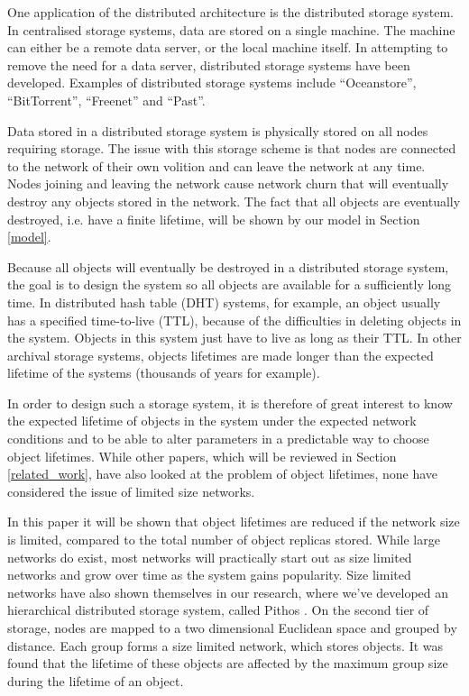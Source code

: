 \documentclass[10pt,a4paper,conference]{IEEEtran}
\begin{document}
One application of the distributed architecture is the distributed storage system. In centralised storage systems, data are stored on a single machine. The machine can either be a remote data server, or the local machine itself. In attempting to remove the need for a data server, distributed storage systems have been developed. Examples of distributed storage systems include ``Oceanstore'', ``BitTorrent'', ``Freenet'' and ``Past''.

Data stored in a distributed storage system is physically stored on all nodes requiring storage. The issue with this storage scheme is that nodes are connected to the network of their own volition and can leave the network at any time. Nodes joining and leaving the network cause network churn that will eventually destroy any objects stored in the network. The fact that all objects are eventually destroyed, i.e. have a finite lifetime, will be shown by our model in Section \ref{model}.

Because all objects will eventually be destroyed in a distributed storage system, the goal is to design the system so all objects are available for a sufficiently long time. In distributed hash table (DHT) systems, for example, an object usually has a specified time-to-live (TTL), because of the difficulties in deleting objects in the system. Objects in this system just have to live as long as their TTL. In other archival storage systems, objects lifetimes are made longer than the expected lifetime of the systems (thousands of years for example).

In order to design such a storage system, it is therefore of great interest to know the expected lifetime of objects in the system under the expected network conditions and to be able to alter parameters in a predictable way to choose object lifetimes. While other papers, which will be reviewed in Section \ref{related_work}, have also looked at the problem of object lifetimes, none have considered the issue of limited size networks.

In this paper it will be shown that object lifetimes are reduced if the network size is limited, compared to the total number of object replicas stored. While large networks do exist, most networks will practically start out as size limited networks and grow over time as the system gains popularity. Size limited networks have also shown themselves in our research, where we've developed an hierarchical distributed storage system, called Pithos \cite{}. On the second tier of storage, nodes are mapped to a two dimensional Euclidean space and grouped by distance. Each group forms a size limited network, which stores objects. It was found that the lifetime of these objects are affected by the maximum group size during the lifetime of an object.
\end{document}
